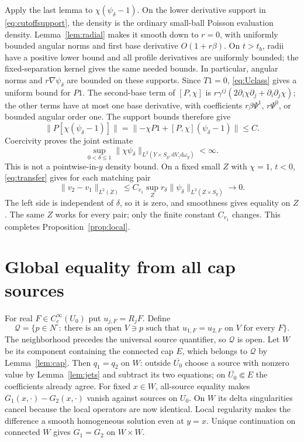 \documentclass[11pt]{article}
\theoremstyle{definition}\newtheorem{definition}[theorem]{Definition}
\theoremstyle{remark}\newtheorem{remark}[theorem]{Remark}
\newcommand{\dd}{\mathrm d}
\newcommand{\vol}{\dd V}
\newcommand{\norm}[1]{\lVert #1\rVert}
\begin{document}
Apply the last lemma to $\chi(\psi_\delta-1)$.
On the lower derivative support in \eqref{eq:cutoffsupport}, the density is
the ordinary small-ball Poisson evaluation density. Lemma~\ref{lem:radial}
makes it smooth down to $r=0$, with uniformly bounded angular norms and
first base derivative $O(1+r\beta)$. On $t>t_b$, radii have a positive
lower bound and all profile derivatives are uniformly bounded; the
fixed-separation kernel gives the same needed bounds. In particular,
angular norms and $r\nabla\psi_\delta$ are bounded on these supports.
Since $T1=0$, \eqref{eq:Uclass} gives a uniform bound for $P1$.
The second-base term of $[P,\chi]$ is
$r\gamma^{ij}(2\partial_i\chi\partial_j+\partial_i\partial_j\chi)$;
the other terms have at most one base derivative, with coefficients
$r\beta\Psi^1$, $r\Psi^0$, or bounded angular order one.
The support bounds therefore give
\[
 \norm{P[\chi(\psi_\delta-1)]}
 =\norm{-\chi P1+[P,\chi](\psi_\delta-1)}\le C.
\]
Coercivity proves the joint estimate
\begin{equation}\label{eq:joint}
 \sup_{0<\delta\le1}\norm{\chi\psi_\delta}_{L^2(Y\times S_y,
                    \vol_\gamma\dd\omega_y)}<\infty.
\end{equation}
This is not a pointwise-in-$y$ density bound. On a fixed small $Z$ with
$\chi=1$, $t<0$, \eqref{eq:transfer} gives for each matching pair
\[
 \norm{v_2-v_1}_{L^2(Z)}
 \le C_{v_1}\sup_Zr_\delta
          \norm{\psi_\delta}_{L^2(Z\times S_y)}\longrightarrow0.
\]
The left side is independent of $\delta$, so it is zero, and smoothness
gives equality on $Z$. The same $Z$ works for every pair; only the finite
constant $C_{v_1}$ changes. This completes Proposition~\ref{prop:local}.

\section{Global equality from all cap sources}\label{sec:global}

For real $F\in C_c^\infty(U_0)$ put $u_{j,F}=R_jF$. Define
\[
 \mathcal Q=\{p\in N^\circ:\ \text{there is an open }V\ni p
         \text{ such that }u_{1,F}=u_{2,F}\text{ on }V\text{ for every }F\}.
\]
The neighborhood precedes the universal source quantifier, so $\mathcal Q$
is open. Let $W$ be its component containing the connected cap $E$,
which belongs to $\mathcal Q$ by Lemma~\ref{lem:cap}.
Then $q_1=q_2$ on $W$: outside $\overline{U_0}$ choose a source with
nonzero value by Lemma~\ref{lem:jets} and subtract its two equations;
on $\overline{U_0}\Subset E$ the coefficients already agree.
For fixed $x\in W$, all-source equality makes
$G_1(x,\cdot)-G_2(x,\cdot)$ vanish against sources on $U_0$.
On $W$ its delta singularities cancel because the local operators are now
identical. Local regularity makes the difference a smooth homogeneous
solution even at $y=x$. Unique continuation on connected $W$ gives
$G_1=G_2$ on $W\times W$.
\end{document}
